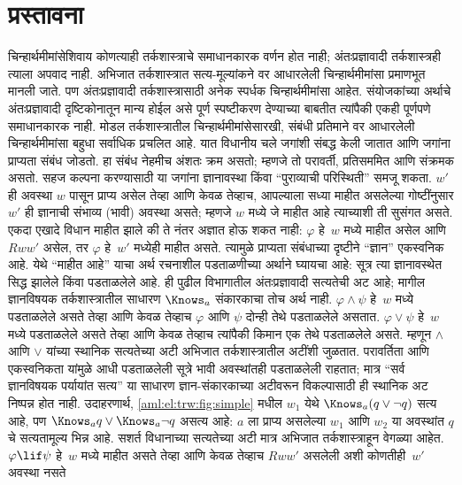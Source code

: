 \section{प्रस्तावना}\label{int:sem:int:sec}
चिन्हार्थमीमांसेशिवाय कोणत्याही तर्कशास्त्राचे
समाधानकारक वर्णन होत नाही; अंतःप्रज्ञावादी
तर्कशास्त्रही त्याला अपवाद नाही. अभिजात
तर्कशास्त्रात सत्य-मूल्यांकने वर आधारलेली
चिन्हार्थमीमांसा प्रमाणभूत मानली जाते. पण
अंतःप्रज्ञावादी तर्कशास्त्रासाठी अनेक स्पर्धक
चिन्हार्थमीमांसा आहेत. संयोजकांच्या अर्थाचे
अंतःप्रज्ञावादी दृष्टिकोनातून मान्य होईल असे
पूर्ण स्पष्टीकरण देण्याच्या बाबतीत त्यांपैकी
एकही पूर्णपणे समाधानकारक नाही.
मोडल तर्कशास्त्रातील चिन्हार्थमीमांसेसारखी,
संबंधी प्रतिमाने वर आधारलेली चिन्हार्थमीमांसा
बहुधा सर्वाधिक प्रचलित आहे. यात विधानीय चले
जगांशी संबद्ध केली जातात आणि जगांना प्राप्यता
संबंध जोडतो. हा संबंध नेहमीच अंशतः क्रम असतो;
म्हणजे तो परावर्ती, प्रतिसममित आणि संक्रमक असतो.
सहज कल्पना करण्यासाठी या जगांना ज्ञानावस्था किंवा
“पुराव्याची परिस्थिती” समजू शकता. $w'$ ही अवस्था
$w$ पासून प्राप्य असेल तेव्हा आणि केवळ तेव्हाच,
आपल्याला सध्या माहीत असलेल्या गोष्टींनुसार $w'$
ही ज्ञानाची संभाव्य (भावी) अवस्था असते; म्हणजे
$w$ मध्ये जे माहीत आहे त्याच्याशी ती सुसंगत असते.
एकदा एखादे विधान माहीत झाले की ते नंतर अज्ञात
होऊ शकत नाही: $\varphi$ हे~$w$ मध्ये माहीत असेल
आणि~$Rww'$ असेल, तर $\varphi$ हे~$w'$ मध्येही माहीत
असते. त्यामुळे प्राप्यता संबंधाच्या दृष्टीने
“ज्ञान” एकस्वनिक आहे.
येथे “माहीत आहे” याचा अर्थ रचनाशील पडताळणीच्या
अर्थाने घ्यायचा आहे: सूत्र त्या ज्ञानावस्थेत सिद्ध झालेले
किंवा पडताळलेले आहे. ही पुढील विभागातील अंतःप्रज्ञावादी
सत्यतेची अट आहे; मागील ज्ञानविषयक तर्कशास्त्रातील
साधारण $\Knows_a$ संकारकाचा तोच अर्थ नाही.
$\varphi\land \psi$ हे~$w$ मध्ये पडताळलेले असते तेव्हा
आणि केवळ तेव्हाच $\varphi$ आणि $\psi$ दोन्ही तेथे पडताळलेले
असतात. $\varphi\lor \psi$ हे~$w$ मध्ये पडताळलेले असते
तेव्हा आणि केवळ तेव्हाच त्यांपैकी किमान एक तेथे
पडताळलेले असते. म्हणून $\land$ आणि $\lor$ यांच्या
स्थानिक सत्यतेच्या अटी अभिजात तर्कशास्त्रातील अटींशी जुळतात.
परावर्तिता आणि एकस्वनिकता यांमुळे आधी पडताळलेली सूत्रे
भावी अवस्थांतही पडताळलेली राहतात; मात्र “सर्व ज्ञानविषयक
पर्यायांत सत्य” या साधारण ज्ञान-संकारकाच्या अटीवरून
विकल्पासाठी ही स्थानिक अट निष्पन्न होत नाही.
उदाहरणार्थ, \ref{aml:el:trw:fig:simple} मधील $w_1$
येथे $\Knows_a(q\lor\lnot q)$ सत्य आहे, पण
$\Knows_a q\lor\Knows_a\lnot q$ असत्य आहे:
$a$ ला प्राप्य असलेल्या $w_1$ आणि $w_2$ या अवस्थांत
$q$ चे सत्यतामूल्य भिन्न आहे.
सशर्त विधानाच्या सत्यतेच्या अटी मात्र अभिजात
तर्कशास्त्राहून वेगळ्या आहेत. $\varphi \lif \psi$
हे~$w$ मध्ये माहीत असते तेव्हा आणि केवळ तेव्हाच
$Rww'$ असलेली अशी कोणतीही~$w'$ अवस्था नसते
